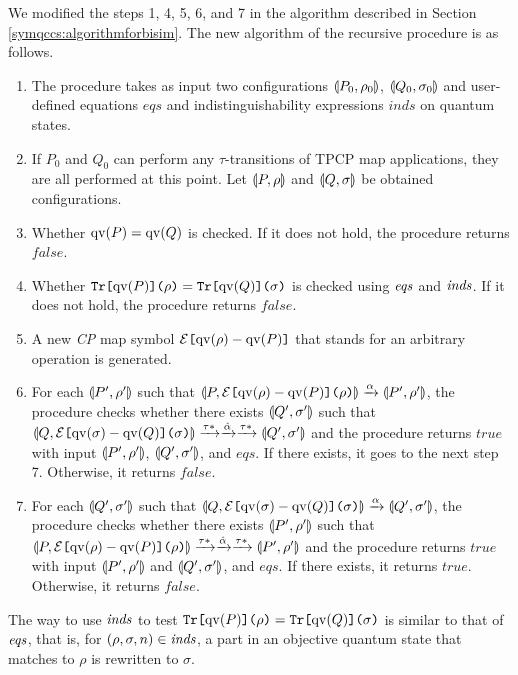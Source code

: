 We modified the steps 1, 4, 5, 6, and 7 in the algorithm described in
Section \ref{symqccs:algorithmforbisim}.
The new algorithm of the recursive procedure is as follows.
\begin{enumerate}
 \item The procedure takes as input two configurations
       $\llparenthesis P_0, \rho_0 \rrparenthesis$,
       $\llparenthesis Q_0, \sigma_0 \rrparenthesis$ and user-defined equations $\mathit{eqs}$
       and indistinguishability expressions $\mathit{inds}$
       on quantum states.
 \item If $P_0$ and $Q_0$ can perform any $\tau$-transitions of
       TPCP map applications, they are all performed at this point.
       Let $\llparenthesis P, \rho \rrparenthesis$ and $\llparenthesis Q, \sigma \rrparenthesis$ be obtained
       configurations.
 \item Whether $\mathrm{qv}(P) = \mathrm{qv}(Q)$ is checked. If it does not hold, the
       procedure returns $\mathit{false}$.
 \item Whether $\texttt{Tr[}\mathrm{qv}(P)\texttt{](}\rho\texttt{)} = \texttt{Tr[}\mathrm{qv}(Q)\texttt{](}\sigma\texttt{)}$ is
       checked using $\mathit{eqs}$ and $\mathit{inds}$.
       If it does not hold, the procedure returns $\mathit{false}$.
 \item A new {\it CP} map symbol $\mathcal{E}\texttt{[}\mathrm{qv}(\rho) - \mathrm{qv}(P)\texttt{]}$
       that stands for an
       arbitrary operation is generated. 
 \item For each $\llparenthesis P', \rho' \rrparenthesis$ such that
       $\llparenthesis P, \mathcal{E}\texttt{[}\mathrm{qv}(\rho) -
       \mathrm{qv}(P)\texttt{](}\rho\texttt{)} \rrparenthesis \xrightarrow{\alpha}
       \llparenthesis P', \rho' \rrparenthesis$,
       the procedure checks whether there exists $\llparenthesis Q', \sigma' \rrparenthesis$ such
       that \\
       $\llparenthesis Q, \mathcal{E}\texttt{[}\mathrm{qv}(\sigma) -
       \mathrm{qv}(Q)\texttt{](}\sigma\texttt{)} \rrparenthesis \xrightarrow{\tau*} \xrightarrow{\hat \alpha} \xrightarrow{\tau*}
       \llparenthesis Q', \sigma' \rrparenthesis$ and 
       the procedure returns $\mathit{true}$ with input
       $\llparenthesis P', \rho' \rrparenthesis$,
       $\llparenthesis Q', \sigma' \rrparenthesis$, and $\mathit{eqs}$. If there exists, it goes
       to the
       next step 7. Otherwise, it returns $\mathit{false}$.
 \item For each $\llparenthesis Q', \sigma' \rrparenthesis$ such that
       $\llparenthesis Q, \mathcal{E}\texttt{[}\mathrm{qv}(\sigma) -
       \mathrm{qv}(Q)\texttt{](}\sigma\texttt{)} \rrparenthesis \xrightarrow{\alpha}
       \llparenthesis Q', \sigma' \rrparenthesis$,
       the procedure checks whether there exists $\llparenthesis P', \rho' \rrparenthesis$ such
       that\\
       $\llparenthesis P, \mathcal{E}\texttt{[}\mathrm{qv}(\rho) -
       \mathrm{qv}(P)\texttt{](}\rho\texttt{)} \rrparenthesis \xrightarrow{\tau*} \xrightarrow{\hat \alpha} \xrightarrow{\tau*}
       \llparenthesis P', \rho' \rrparenthesis$ and 
       the procedure returns $\mathit{true}$ with input
       $\llparenthesis P', \rho' \rrparenthesis$ and
       $\llparenthesis Q', \sigma' \rrparenthesis$, and $\mathit{eqs}$. If there exists, it
       returns
       $\mathit{true}$. Otherwise, it returns $\mathit{false}$.
\end{enumerate}
The way to use $\mathit{inds}$ to test $\texttt{Tr[}\mathrm{qv}(P)\texttt{](}\rho\texttt{)} =
\texttt{Tr[}\mathrm{qv}(Q)\texttt{](}\sigma\texttt{)}$
is similar to that of $\mathit{eqs}$, that is,
for $(\rho, \sigma, n) \in \mathit{inds}$,
a part in an objective quantum state
that matches to $\rho$ is rewritten to $\sigma$.

